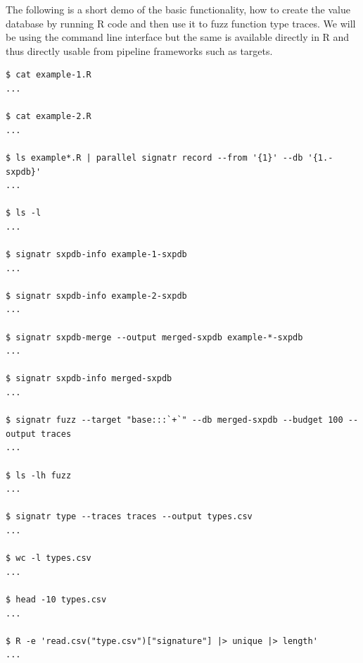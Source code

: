 \documentclass[sigplan,anonymous,review]{acmart}
\begin{document}
The following is a short demo of the basic \tool functionality, \Ie how to create the value database by running R code and then use it to fuzz function type traces.
We will be using the command line interface but the same is available directly in R and thus directly usable from pipeline frameworks such as targets.


\begin{lstlisting}
$ cat example-1.R
...

$ cat example-2.R
...

$ ls example*.R | parallel signatr record --from '{1}' --db '{1.-sxpdb}'
...

$ ls -l
...

$ signatr sxpdb-info example-1-sxpdb
...

$ signatr sxpdb-info example-2-sxpdb
...

$ signatr sxpdb-merge --output merged-sxpdb example-*-sxpdb
...

$ signatr sxpdb-info merged-sxpdb
...

$ signatr fuzz --target "base:::`+`" --db merged-sxpdb --budget 100 --output traces
...

$ ls -lh fuzz
...

$ signatr type --traces traces --output types.csv
...

$ wc -l types.csv
...

$ head -10 types.csv
...

$ R -e 'read.csv("type.csv")["signature"] |> unique |> length'
...

\end{lstlisting}
\end{document}
